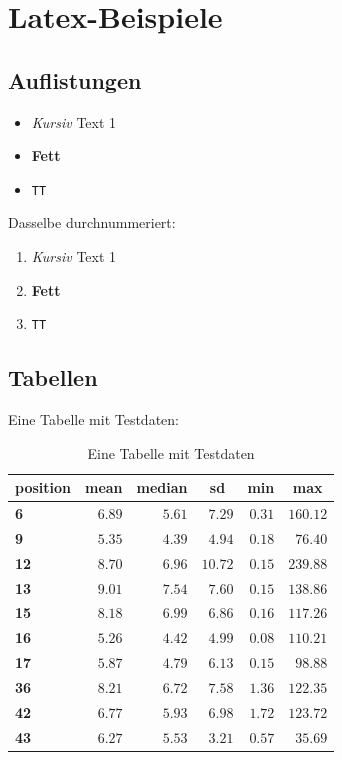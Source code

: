 
\chapter{Latex-Beispiele}
\label{chap:bsp}

\section{Auflistungen}

\begin{itemize}
	\item \textit{Kursiv} Text 1
	\item \textbf{Fett}  
	\item \texttt{TT} 
\end{itemize}

Dasselbe durchnummeriert:

\begin{enumerate}
	\item \textit{Kursiv} Text 1
	\item \textbf{Fett}  
	\item \texttt{TT} 
\end{enumerate}

\newpage
\section{Tabellen}

Eine Tabelle mit Testdaten:


\begin{table}[H]
	\begin{center}
		\begin{tabular}{lrrrrr}\hline\hline
			\multicolumn{1}{l}{\textbf{position}}&
			\multicolumn{1}{c}{\textbf{mean}}&
			\multicolumn{1}{c}{\textbf{median}}&
			\multicolumn{1}{c}{\textbf{sd}}&
			\multicolumn{1}{c}{\textbf{min}}&
			\multicolumn{1}{c}{\textbf{max}}
			\\ \hline
			\textbf{6}&$6.89$&$5.61$&$ 7.29$&$0.31$&$160.12$\\
			\textbf{9}&$5.35$&$4.39$&$ 4.94$&$0.18$&$ 76.40$\\
			\textbf{12}&$8.70$&$6.96$&$10.72$&$0.15$&$239.88$\\
			\textbf{13}&$9.01$&$7.54$&$ 7.60$&$0.15$&$138.86$\\
			\textbf{15}&$8.18$&$6.99$&$ 6.86$&$0.16$&$117.26$\\
			\textbf{16}&$5.26$&$4.42$&$ 4.99$&$0.08$&$110.21$\\
			\textbf{17}&$5.87$&$4.79$&$ 6.13$&$0.15$&$ 98.88$\\
			\textbf{36}&$8.21$&$6.72$&$ 7.58$&$1.36$&$122.35$\\
			\textbf{42}&$6.77$&$5.93$&$ 6.98$&$1.72$&$123.72$\\
			\textbf{43}&$6.27$&$5.53$&$ 3.21$&$0.57$&$ 35.69$\\
			\hline
		\end{tabular}
	\end{center}
	\caption{Eine Tabelle mit Testdaten} 
	\label{tabelle:test}
\end{table}


